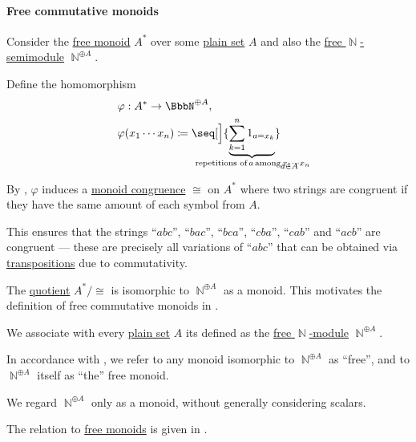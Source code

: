 \paragraph{Free commutative monoids}

\begin{remark}\label{rem:free_commutative_monoid_as_quotient}
  Consider the \hyperref[def:free_monoid]{free monoid} \( A^* \) over some \hyperref[def:set]{plain set} \( A \) and also the \hyperref[def:free_semimodule]{free \( \BbbN \)-semimodule} \( \BbbN^{\oplus A} \).

  Define the homomorphism
  \begin{equation*}
    \begin{aligned}
      &\varphi: A^* \to \BbbN^{\oplus A}, \\
      &\varphi(x_1 \cdots x_n) \coloneqq \seq[\Big]{ \underbrace{\sum_{k=1}^n 1_{a = x_k}}_{\mathclap{\T*{repetitions of} a \T*{among} x_1 \cdots x_n} }}_{a \in A}
    \end{aligned}
  \end{equation*}

  By , \( \varphi \) induces a \hyperref[def:first_order_congruence]{monoid congruence} \( \cong \) on \( A^* \) where two strings are congruent if they have the same amount of each symbol from \( A \).

  This ensures that the strings \enquote{\( abc \)}, \enquote{\( bac \)}, \enquote{\( bca \)}, \enquote{\( cba \)}, \enquote{\( cab \)} and \enquote{\( acb \)} are congruent --- these are precisely all variations of \enquote{\( abc \)} that can be obtained via \hyperref[def:transposition]{transpositions} due to commutativity.

  The \hyperref[def:first_order_quotient]{quotient} \( A^* / \cong \) is isomorphic to \( \BbbN^{\oplus A} \) as a monoid. This motivates the definition of free commutative monoids in .
\end{remark}

\begin{definition}\label{def:free_commutative_monoid}\mimprovised
  We associate with every \hyperref[def:set]{plain set} \( A \) its  defined as the \hyperref[def:free_semimodule]{free \( \BbbN \)-module} \( \BbbN^{\oplus A} \).
\end{definition}
\begin{comments}
  \item In accordance with , we refer to any monoid isomorphic to \( \BbbN^{\oplus A} \) as \enquote{free}, and to \( \BbbN^{\oplus A} \) itself as \enquote{the} free monoid.

  \item We regard \( \BbbN^{\oplus A} \) only as a monoid, without generally considering scalars.

  \item The relation to \hyperref[def:free_monoid]{free monoids} is given in .
\end{comments}

